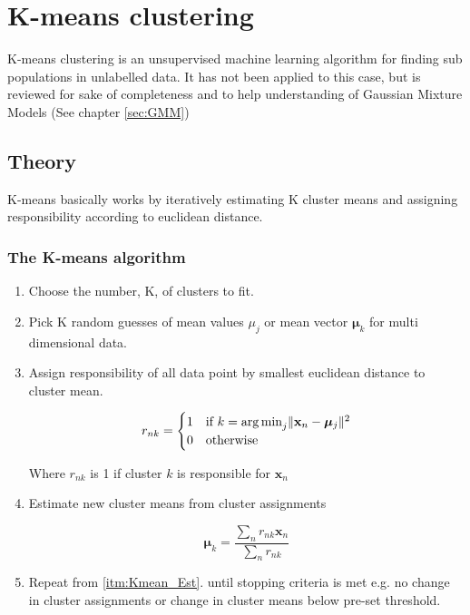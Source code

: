 \chapter{K-means clustering}
K-means clustering is an unsupervised machine learning algorithm for finding sub populations in unlabelled data.
It has not been applied to this case, but is reviewed for sake of completeness and to help understanding of Gaussian Mixture Models (See chapter \ref{sec:GMM}) 
\section{Theory} 

K-means basically works by iteratively estimating K cluster means and assigning responsibility according to euclidean distance.

\subsection{The K-means algorithm}

\begin{enumerate}

\item
Choose the number, K, of clusters to fit.

\item
Pick K random guesses of mean values $ \mu_j $ or mean vector $ \bm{\mu}_k $ for multi dimensional data.

\item \label{itm:Kmean_Est}
Assign responsibility of all data point by smallest euclidean distance to cluster mean.

\begin{equation}
r_{nk} =
  \begin{cases}
    1 & \text{if } k = 
    	\operatorname*{arg\,min}_j \lVert \mathbf{x}_n - \bm{\mu}_j \rVert^2\\
    0 & \text{otherwise}
  \end{cases} 
\end{equation}

Where $ r_{nk} $ is 1 if cluster $ k $ is responsible for $ \mathbf{x}_n $ 

\item \label{itm:Kmean_Max}
Estimate new cluster means from cluster assignments

\begin{equation}
\bm{\mu}_k = 
\dfrac{\sum_n r_{nk}\mathbf{x}_n}
{\sum_n r_{nk}}
\end{equation}

\item
Repeat from \ref{itm:Kmean_Est}. until stopping criteria is met e.g. no change in cluster assignments or change in cluster means below pre-set threshold. 

\end{enumerate}

